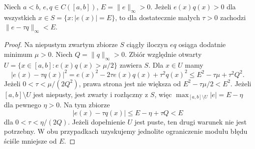 \begin{lemat}
\label{ma2:lem:approx-improvement}
Niech $a<b$, $e,q\in C([a,b])$, $E=\|e\|_\infty>0$.
Jeżeli $e(x)q(x)>0$ dla wszystkich
$x\in S=\{x:|e(x)|=E\}$, to dla dostatecznie
małych $\tau>0$ zachodzi
$\|e-\tau q\|_\infty<E$.
\end{lemat}
\begin{proof}
Na niepustym zwartym zbiorze $S$
ciągły iloczyn $eq$ osiąga dodatnie minimum
$\mu>0$. Niech $Q=\|q\|_\infty>0$.
Zbiór względnie otwarty
$U=\{x\in[a,b]:e(x)q(x)>\mu/2\}$ zawiera $S$.
Dla $x\in U$ mamy
\[
 |e(x)-\tau q(x)|^2
 =e(x)^2-2\tau e(x)q(x)+\tau^2 q(x)^2
 \le E^2-\tau\mu+\tau^2Q^2.
\]
Jeżeli $0<\tau<\mu/(2Q^2)$, prawa strona
jest nie większa od $E^2-\tau\mu/2<E^2$.
Jeżeli $[a,b]\setminus U$ jest niepusty,
jest zwarty i rozłączny z $S$, więc
$\max_{[a,b]\setminus U}|e|=E-\eta$
dla pewnego $\eta>0$. Na tym zbiorze
\[
 |e(x)-\tau q(x)|\le E-\eta+\tau Q<E
\]
dla $0<\tau<\eta/(2Q)$.
Jeżeli dopełnienie $U$ jest puste,
ten drugi warunek nie jest potrzebny.
W obu przypadkach uzyskujemy jednolite
ograniczenie modułu błędu ściśle mniejsze od $E$.
\end{proof}


